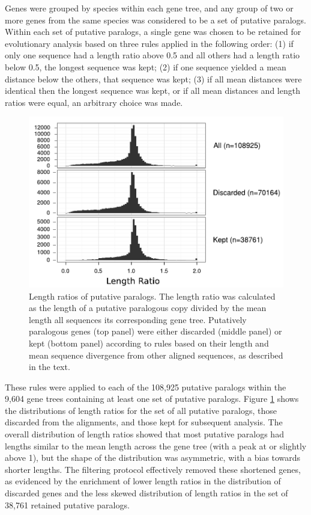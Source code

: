Genes were grouped by species within each gene tree, and any group of
two or more genes from the same species was considered to be a set of
putative paralogs. Within each set of putative paralogs, a single gene
was chosen to be retained for evolutionary analysis based on three
rules applied in the following order: (1) if only one sequence had a
length ratio above 0.5 and all others had a length ratio below 0.5,
the longest sequence was kept; (2) if one sequence yielded a mean
distance below the others, that sequence was kept; (3) if all mean
distances were identical then the longest sequence was kept, or if all
mean distances and length ratios were equal, an arbitrary choice was
made.

\begin{figure}
\centering
\includegraphics[scale=0.9]{Figs/mammals_paralogs_hist.pdf}
\caption{Length ratios of putative paralogs. The length ratio was
  calculated as the length of a putative paralogous copy divided by
  the mean length all sequences its corresponding gene
  tree. Putatively paralogous genes (top panel) were either discarded
  (middle panel) or kept (bottom panel) according to rules based on
  their length and mean sequence divergence from other aligned
  sequences, as described in the text.}
\label{filtered_paralogs_hist}
\end{figure}

These rules were applied to each of the 108,925 putative paralogs
within the 9,604 gene trees containing at least one set of putative
paralogs. Figure \ref{filtered_paralogs_hist} shows the distributions
of length ratios for the set of all putative paralogs, those discarded
from the alignments, and those kept for subsequent analysis. The
overall distribution of length ratios showed that most putative
paralogs had lengths similar to the mean length across the gene tree
(with a peak at or slightly above 1), but the shape of the
distribution was asymmetric, with a bias towards shorter lengths. The
filtering protocol effectively removed these shortened genes, as
evidenced by the enrichment of lower length ratios in the distribution
of discarded genes and the less skewed distribution of length ratios
in the set of 38,761 retained putative paralogs.

